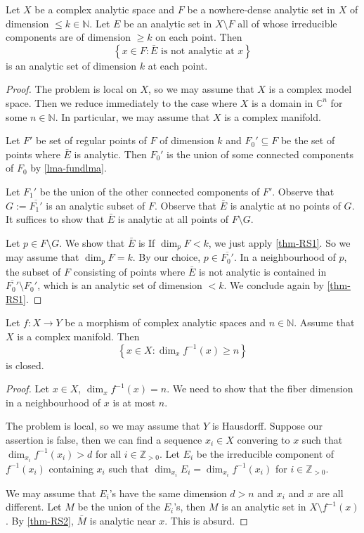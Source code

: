 \begin{thm}\label{thm-RS2}
    Let $X$ be a complex analytic space and $F$ be a nowhere-dense analytic set in $X$ of dimension $\leq k\in \mathbb{N}$. Let $E$ be an analytic set in $X\setminus F$ all of whose irreducible components are of dimension $\geq k$ on each point. Then 
    \[
        \left\{x\in F: \bar{E}\text{ is not analytic at }x \right\}  
    \]
    is an analytic set of dimension $k$ at each point.
\end{thm}
\begin{proof}
    The problem is local on $X$, so we may assume that $X$ is a complex model space. Then we reduce immediately to the case where $X$ is a domain in $\mathbb{C}^n$ for some $n\in \mathbb{N}$. In particular, we may assume that $X$ is a complex manifold.

    Let $F'$ be set of regular points of $F$ of dimension $k$ and $F_0'\subseteq F$ be the set of points where $\bar{E}$ is analytic. Then $F_0'$ is the union of some connected components of $F_0$ by \cref{lma-fundlma}.

    Let $F_1'$ be the union of the other connected components of $F'$. Observe that $G:=\overline{F_1'}$ is an analytic subset of $F$. Observe that $\bar{E}$ is analytic at no points of $G$. It suffices to show that $\bar{E}$ is analytic at all points of $F\setminus G$.

    Let $p\in F\setminus G$. We show that $\bar{E}$ is 
    If $\dim_p F<k$, we just apply \cref{thm-RS1}. So we may assume that $\dim_p F=k$. By our choice, $p\in \overline{F_0'}$. In a neighbourhood of $p$, the subset of $F$ consisting of points where $\bar{E}$ is not analytic is contained in $\overline{F_0'}\setminus F_0'$, which is an analytic set of dimension $<k$. We conclude again by \cref{thm-RS1}.
\end{proof}


\begin{corollary}\label{cor-fiberdimuscanatop}
    Let $f:X\rightarrow Y$ be a morphism of complex analytic spaces and $n\in \mathbb{N}$. Assume that $X$ is a complex manifold.
    Then 
    \[
        \left\{ x\in X: \dim_x f^{-1}(x)\geq n \right\}  
    \]
    is closed.
\end{corollary}
\begin{proof}
    Let $x\in X$, $\dim_x f^{-1}(x)=n$. We need to show that the fiber dimension in a neighbourhood of $x$ is at most $n$. 

    The problem is local, so we may assume that $Y$ is Hausdorff. Suppose our assertion is false, then we can find a sequence $x_i\in X$ convering to $x$ such that $\dim_{x_i}f^{-1}(x_i)>d$ for all $i\in \mathbb{Z}_{>0}$. Let $E_i$ be the irreducible component of $f^{-1}(x_i)$ containing $x_i$ such that $\dim_{x_i} E_i=\dim_{x_i}f^{-1}(x_i)$ for $i\in \mathbb{Z}_{>0}$.

    We may assume that $E_i$'s have the same dimension $d>n$ and $x_i$ and $x$ are all different. Let $M$ be the union of the $E_i$'s, then $M$ is an analytic set in $X\setminus f^{-1}(x)$. By \cref{thm-RS2}, $\bar{M}$ is analytic near $x$. This is absurd.
\end{proof}


